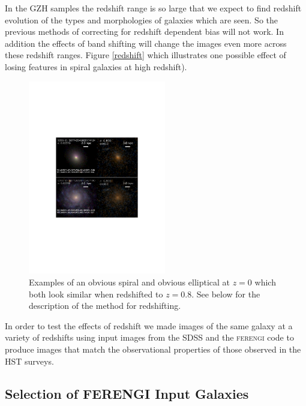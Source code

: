 \documentclass[usenatbib]{mn2e}
\newcommand{\ferengi}{\textsc{ferengi}}
\begin{document}
In the GZH samples the redshift range is so large that we expect to find redshift evolution of the types and morphologies of galaxies which are seen. So the previous methods of correcting for redshift dependent bias will not work. In addition the effects of band shifting will change the images even more across these redshift ranges. Figure \ref{redshift} which illustrates one possible effect of losing features in spiral galaxies at high redshift). 

\begin{figure}
\begin{center}
\includegraphics[width=60mm]{figures/example_ferengi2.pdf}
\caption{Examples of an obvious spiral and obvious elliptical at $z=0$ which both look similar when redshifted to $z=0.8$. See below for the description of the method for redshifting.\label{exampleFERENGI}}
\end{center}
\end{figure}

In order to test the effects of redshift we made images of the same galaxy at a variety of redshifts using input images from the SDSS \citep{yor00,str02} and the \ferengi{} code \citep{bar08a} to produce images that match the observational properties of those observed in the HST surveys. 
 
\subsection{Selection of FERENGI Input Galaxies}
\end{document}
